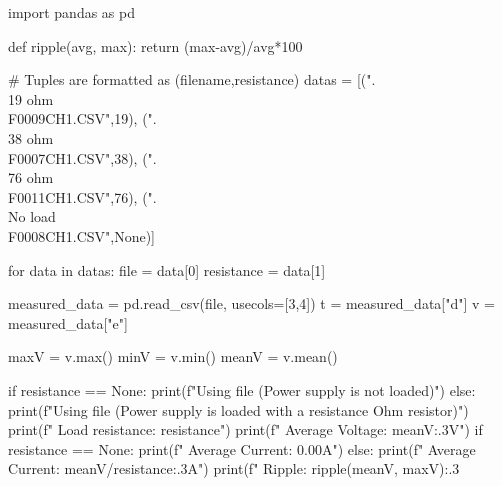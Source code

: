 \begin{python}
import pandas as pd

def ripple(avg, max):
    return (max-avg)/avg*100

# Tuples are formatted as (filename,resistance)
datas = [(".\\19 ohm\\F0009CH1.CSV",19),
    	(".\\38 ohm\\F0007CH1.CSV",38),
    	(".\\76 ohm\\F0011CH1.CSV",76),
    	(".\\No load\\F0008CH1.CSV",None)]

for data in datas:
    file = data[0]
    resistance = data[1]
    
    measured_data = pd.read_csv(file, usecols=[3,4])
    t = measured_data["d"]
    v = measured_data["e"]

    maxV = v.max()
    minV = v.min()
    meanV = v.mean()

    if resistance == None:
        print(f"Using {file} (Power supply is not loaded)")
    else:
        print(f"Using {file} (Power supply is loaded with a {resistance} Ohm resistor)")
    print(f"    Load resistance: {resistance}")   
    print(f"    Average Voltage: {meanV:.3}V")
    if resistance == None:
        print(f"    Average Current: 0.00A")
    else:
        print(f"    Average Current: {meanV/resistance:.3}A")
    print(f"    Ripple: {ripple(meanV, maxV):.3}%

\end{python}

